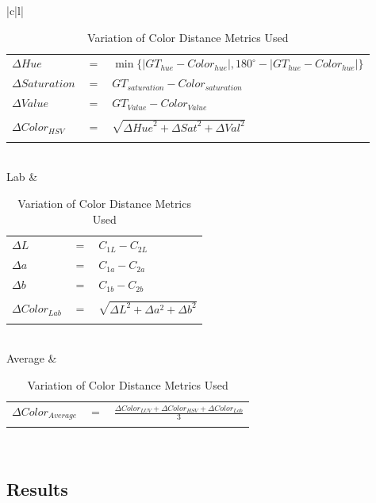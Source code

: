 \begin{table}[]
\begin{tabular}{|c|l|}
\begin{tabular}{lcl}
$\Delta{Hue}$ & $=$ & $\min\{ \mid GT_{hue} - Color_{hue} \mid,  180^{\circ} - \mid GT_{hue} - Color_{hue} \mid  \}$ \\
$\Delta  Saturation$ & $=$ & $GT_{saturation} - Color_{saturation}$ \\
$\Delta  Value$ &  $=$ & $GT_{Value} - Color_{Value}$ \\
\\
$\Delta Color_{HSV}$ & $=$ & $\sqrt{\Delta{Hue}^{2} + \Delta{Sat}^{2}  + \Delta{Val}^{2} }$
\\
\hspace{4em}& & \\
\end{tabular}\\
\hline
Lab & 
\begin{tabular}{lcl}
\\
$\Delta L$ & $=$ & $C_{1L} - C_{2L}$\\
$\Delta a$ & $=$ & $C_{1a} - C_{2a}$\\
$\Delta b$ & $=$ & $C_{1b} - C_{2b}$\\
\\
$\Delta{Color_{Lab}}$ & $=$ & $\sqrt{\Delta{L}^{2} + \Delta{a}^{2}  + \Delta{b}^{2} }$
\\
\hspace{5em}& & \\
\end{tabular}\\
\hline
Average &
\begin{tabular}{lcl}
\\
$\Delta{Color_{Average}}$ & $=$ & $\frac{\Delta{Color_{LUV}} + \Delta{Color_{HSV}} + \Delta{Color_{Lab}}}{3}$
\\
\hspace{4em}& & \\
\end{tabular}\\
\hline
\end{tabular}
\caption{Variation of Color Distance Metrics Used}
\label{table:ColorVariation}
\end{table}


\subsection{Results}

